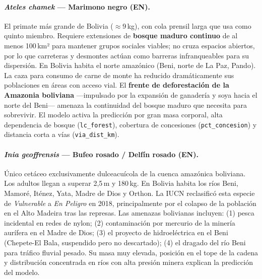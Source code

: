 \documentclass[12pt,a4paper]{article}
\begin{document}
\paragraph{\textit{Ateles chamek} --- Marimono negro (EN).}
El primate más grande de Bolivia ($\approx$9\,kg), con cola prensil larga que usa como
quinto miembro.
Requiere extensiones de \textbf{bosque maduro continuo} de al menos 100\,km²
para mantener grupos sociales viables; no cruza espacios abiertos, por lo que
carreteras y desmontes actúan como barreras infranqueables para su dispersión.
En Bolivia habita el norte amazónico (Beni, norte de La Paz, Pando).
La caza para consumo de carne de monte ha reducido dramáticamente sus poblaciones en
áreas con acceso vial.
El \textbf{frente de deforestación de la Amazonia boliviana}
---impulsado por la expansión de ganadería y soya hacia el norte del Beni---
amenaza la continuidad del bosque maduro que necesita para sobrevivir.
El modelo activa la predicción por gran masa corporal, alta dependencia de bosque
(\texttt{lc\_forest}), cobertura de concesiones (\texttt{pct\_concesion}) y
distancia corta a vías (\texttt{via\_dist\_km}).

\paragraph{\textit{Inia geoffrensis} --- Bufeo rosado / Delfín rosado (EN).}
Único cetáceo exclusivamente dulceacuícola de la cuenca amazónica boliviana.
Los adultos llegan a superar 2,5\,m y 180\,kg.
En Bolivia habita los ríos Beni, Mamoré, Iténez, Yata, Madre de Dios y Orthon.
La IUCN reclasificó esta especie de \textit{Vulnerable} a \textit{En Peligro} en 2018,
principalmente por el colapso de la población en el Alto Madeira tras las represas.
Las amenazas bolivianas incluyen:
(1) pesca incidental en redes de nylon;
(2) contaminación por mercurio de la minería aurífera en el Madre de Dios;
(3) el proyecto de hidroeléctrica en el Beni (Chepete-El Bala, suspendido pero no descartado);
(4) el dragado del río Beni para tráfico fluvial pesado.
Su masa muy elevada, posición en el tope de la cadena y distribución concentrada en ríos
con alta presión minera explican la predicción del modelo.
\end{document}
